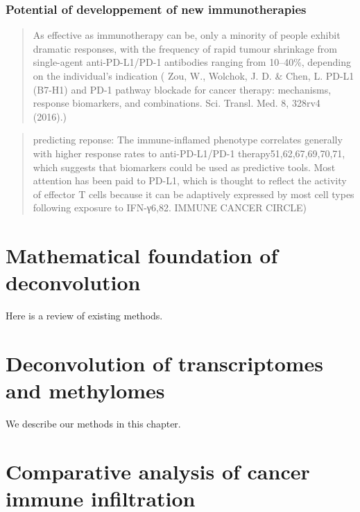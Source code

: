 \documentclass[12pt,]{book}
\theoremstyle{definition}
\theoremstyle{definition}
\theoremstyle{definition}
\theoremstyle{remark}
\begin{document}
\hypertarget{potential-of-developpement-of-new-immunotherapies}{%
\subsection{Potential of developpement of new
immunotherapies}\label{potential-of-developpement-of-new-immunotherapies}}

\begin{quote}
As effective as immunotherapy can be, only a minority of people exhibit
dramatic responses, with the frequency of rapid tumour shrinkage from
single-agent anti-PD-L1/PD-1 antibodies ranging from 10--40\%, depending
on the individual's indication ( Zou, W., Wolchok, J. D. \& Chen, L.
PD-L1 (B7-H1) and PD-1 pathway blockade for cancer therapy: mechanisms,
response biomarkers, and combinations. Sci. Transl. Med. 8, 328rv4
(2016).)
\end{quote}

\begin{quote}
predicting reponse: The immune-inflamed phenotype correlates generally
with higher response rates to anti-PD-L1/PD-1 therapy51,62,67,69,70,71,
which suggests that biomarkers could be used as predictive tools. Most
attention has been paid to PD-L1, which is thought to reflect the
activity of effector T cells because it can be adaptively expressed by
most cell types following exposure to IFN-γ6,82. IMMUNE CANCER CIRCLE)
\end{quote}

\hypertarget{methods}{%
\chapter{Mathematical foundation of deconvolution}\label{methods}}

Here is a review of existing methods.

\hypertarget{deconvolution-of-transcriptomes-and-methylomes}{%
\chapter{Deconvolution of transcriptomes and
methylomes}\label{deconvolution-of-transcriptomes-and-methylomes}}

We describe our methods in this chapter.

\hypertarget{comparative-analysis-of-cancer-immune-infiltration}{%
\chapter{Comparative analysis of cancer immune
infiltration}\label{comparative-analysis-of-cancer-immune-infiltration}}
\end{document}
